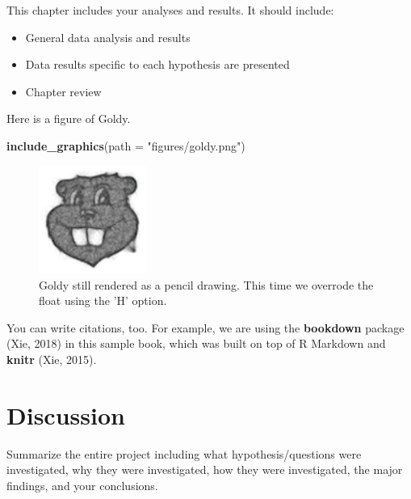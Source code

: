 \documentclass[12pt,letterpaper,oneside,oldfontcommands]{memoir}
\newenvironment{Shaded}{\begin{snugshade}}{\end{snugshade}}
\newcommand{\DataTypeTok}[1]{\textcolor[rgb]{0.13,0.29,0.53}{#1}}
\newcommand{\KeywordTok}[1]{\textcolor[rgb]{0.13,0.29,0.53}{\textbf{#1}}}
\newcommand{\NormalTok}[1]{#1}
\newcommand{\StringTok}[1]{\textcolor[rgb]{0.31,0.60,0.02}{#1}}
\providecommand{\tightlist}{%
  \setlength{\itemsep}{0pt}\setlength{\parskip}{0pt}}
\theoremstyle{definition}
\theoremstyle{definition}
\theoremstyle{definition}
\theoremstyle{remark}
\begin{document}
This chapter includes your analyses and results. It should include:

\begin{itemize}
\tightlist
\item
  General data analysis and results
\item
  Data results specific to each hypothesis are presented
\item
  Chapter review
\end{itemize}

Here is a figure of Goldy.

\begin{Shaded}
\begin{Highlighting}[]
\KeywordTok{include_graphics}\NormalTok{(}\DataTypeTok{path =} \StringTok{"figures/goldy.png"}\NormalTok{)}
\end{Highlighting}
\end{Shaded}

\begin{figure}[H]
\includegraphics[width=1.39in]{figures/goldy} \caption{Goldy still rendered as a pencil drawing. This time we overrode the float using the 'H' option.}\label{fig:goldy2}
\end{figure}

You can write citations, too. For example, we are using the
\textbf{bookdown} package (Xie, 2018) in this sample book, which was
built on top of R Markdown and \textbf{knitr} (Xie, 2015).

\clearpage

\hypertarget{discussion}{%
\chapter{Discussion}\label{discussion}}

Summarize the entire project including what hypothesis/questions were
investigated, why they were investigated, how they were investigated,
the major findings, and your conclusions.
\end{document}

